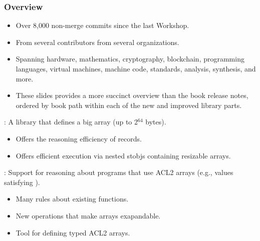 \date{ACL2-2022 Workshop}







\begin{frame}

\frametitle{Overview}

\begin{itemize}
\item Over 8,000 non-merge commits since the last Workshop.
\item From several contributors from several organizations.
\item Spanning hardware, mathematics, cryptography, blockchain,
      programming languages, virtual machines, machine code,
      standards, analysis, synthesis, and more.
\item These slides provides
      a more succinct overview than the book release notes,
      ordered by book path within each of the new and improved library parts.
\end{itemize}

\end{frame}


\begin{frame}[fragile]

\newlibtitle

:
A library that defines a big array (up to 2$^{64}$ bytes).
\begin{itemize}
\item Offers the reasoning efficiency of records.
\item Offers efficient execution via nested stobjs containing resizable arrays.
\end{itemize}

\end{frame}


\begin{frame}

\newlibtitle

:
Support for reasoning about programs that use ACL2 arrays (e.g.,
values satisfying ).

\begin{itemize}
\item Many rules about existing functions.
\item New operations that make arrays exapandable.
\item Tool for defining typed ACL2 arrays.
\end{itemize}

\end{frame}

